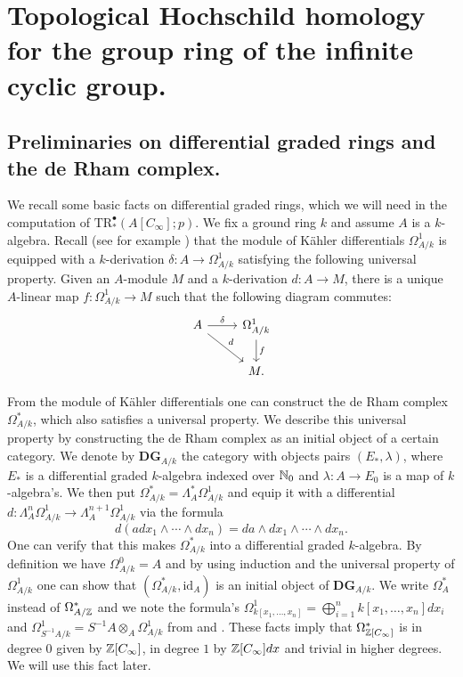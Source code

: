 \chapter{Topological Hochschild homology for the group ring of the infinite cyclic group.}
\section{Preliminaries on differential graded rings and the de Rham complex.}
We recall some basic facts on differential graded rings, which we will need
in the computation of $\mathrm{TR}^\bullet_\ast(A[C_\infty];p)$. We fix a ground ring
$k$ and assume $A$ is a $k$-algebra. Recall (see for example \cite[\pno~386]{eisenbud})
that the module of K\"ahler
differentials $\Omega^1_{A/k}$ is equipped with a $k$-derivation $\delta:A\to \Omega^1_{A/k}$
satisfying the following universal property. Given an $A$-module $M$ and a $k$-derivation
$d:A\to M$, there is a unique $A$-linear map $f:\Omega^1_{A/k}\to M$ such that
the following diagram commutes:
\[
\begin{tikzcd}
A\arrow{r}{\delta}\arrow{dr}{d}
&\Omega^1_{A/k}\arrow{d}{f}\\
&M.
\end{tikzcd}
\]

From the module of K\"ahler differentials one can construct the de Rham
complex $\Omega^\ast_{A/k}$, which also satisfies a universal property. We describe
this universal property by constructing the de Rham complex as an initial object
of a certain category. We denote by $\mathbf{DG}_{A/k}$ the category with
objects pairs $(E_\ast,\lambda)$, where $E_\ast$ is a differential graded $k$-algebra 
indexed over $\mathbb{N}_0$
and $\lambda:A\to E_0$ is a map of $k$-algebra's. We then put
$\Omega^\ast_{A/k} = \Lambda^\ast_A \Omega^1_{A/k}$
and equip it with a differential $d:\Lambda^n_A \Omega^1_{A/k}\to
\Lambda^{n+1}_A \Omega^1_{A/k}$ via the formula
\[
d(adx_1\wedge\cdots \wedge dx_n) = da\wedge dx_1\wedge\cdots \wedge dx_n.
\]
One can verify that this makes $\Omega^\ast_{A/k}$ into a differential
graded $k$-algebra. By definition we have $\Omega^0_{A/k} = A$
and by using induction and the universal property of $\Omega^1_{A/k}$
one can show that $(\Omega^\ast_{A/k}, \mathrm{id}_A)$ is an initial
object of $\mathbf{DG}_{A/k}$. We write $\Omega^\ast_{A}$
instead of $\Omega^\ast_{A/\mathbb{Z}}$ and we note the formula's
$\Omega^1_{k[x_1,\ldots, x_n]} = \bigoplus_{i=1}^nk[x_1,\ldots, x_n] dx_i$
and $\Omega^1_{S^{-1}A/k} = S^{-1}A\otimes_A \Omega^1_{A/k}$
from \cite[Proposition~16.1, \pno~387]{eisenbud} and
\cite[Proposition~16.9, \pno~397]{eisenbud}. These facts imply
that $\Omega^\ast_{\mathbb{Z}[C_\infty]}$ is in degree $0$
given by $\mathbb{Z}[C_\infty]$, in degree $1$ by $\mathbb{Z}[C_\infty] dx$
and trivial in higher degrees. We will use this fact later. 

